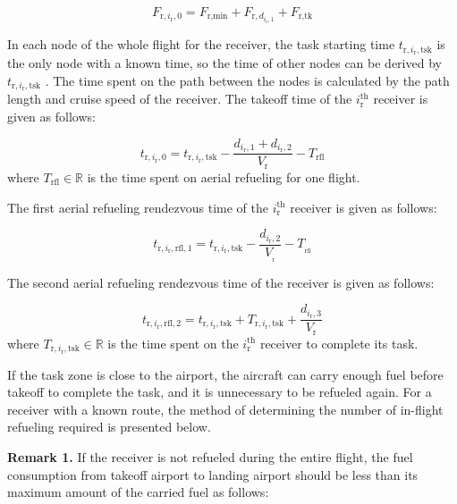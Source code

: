 \begin{equation}
F_{\text{r},i_{\text{r}},0}=F_{\text{r},\text{min}}+F_{\text{r},d_{i_{\text{r}},1}}+F_{\text{r},\text{tk}}
\label{eq:15.15}
\end{equation}

In each node of the whole flight for the receiver, the task starting time  $t_{\text{r},i_{\text{r}},\text{tsk}}$ is the only node with a known time, so the time of other nodes can be derived by $t_{\text{r},i_{\text{r}},\text{tsk}}$ . The time spent on the path between the nodes is calculated by the path length and cruise speed of the receiver. The takeoff time of the $i_{\text{r}}^{\text{th}}$  receiver is given as follows:

\begin{equation}
t_{\text{r},i_{\text{r}},0}=t_{\text{r},i_{\text{r}},\text{tsk}}-\frac{d_{i_{\text{r}},1}+d_{i_{\text{r}},2}}{V_{\text{r}}}-T_{\text{rfl}}
\label{eq:15.16}
\end{equation}
where  $T_{\text{rfl}}\in\mathbb{R}$ is the time spent on aerial refueling for one flight.

The first aerial refueling rendezvous time of the $i_{\text{r}}^{\text{th}}$  receiver is given as follows:

\begin{equation}
t_{\text{r},i_{\text{r}},\text{rfl},1}=t_{\text{r},i_{\text{r}},\text{tsk}}-\frac{d_{i_{\text{r}},2}}{V_{_{\text{r}}}}-T_{_{\text{rfl}}}
\label{eq:15.17}
\end{equation}

The second aerial refueling rendezvous time of the receiver is given as follows:

\begin{equation}
t_{\text{r},i_\text{r},\text{rfl},2}=t_{\text{r},i_\text{r},\text{tsk}}+T_{\text{r},i_\text{r},\text{tsk}}+\frac{d_{i_\text{r},3}}{V_\text{r}}
\label{eq:15.18}
\end{equation}
where $T_{\text{r},i_\text{r},\text{tsk}}\in\mathbb{R}$  is the time spent on the  $i_{\text{r}}^{\text{th}}$  receiver to complete its task.

If the task zone is close to the airport, the aircraft can carry enough fuel before takeoff to complete the task, and it is unnecessary to be refueled again. For a receiver with a known route, the method of determining the number of in-flight refueling required is presented below.

\textbf{Remark 1.} If the receiver is not refueled during the entire flight, the fuel consumption from takeoff airport to landing airport should be less than its maximum amount of the carried fuel as follows:

